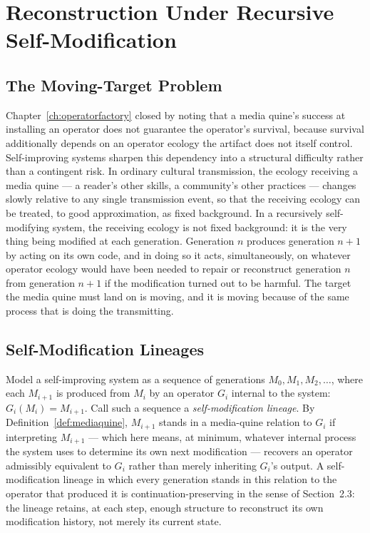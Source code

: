 \documentclass[11pt]{book}
\begin{document}
\chapter{Reconstruction Under Recursive Self-Modification}
\label{ch:reconstruction}

\section{The Moving-Target Problem}

Chapter~\ref{ch:operatorfactory} closed by noting that a media quine's success at installing an operator does not guarantee the operator's survival, because survival additionally depends on an operator ecology the artifact does not itself control. Self-improving systems sharpen this dependency into a structural difficulty rather than a contingent risk. In ordinary cultural transmission, the ecology receiving a media quine --- a reader's other skills, a community's other practices --- changes slowly relative to any single transmission event, so that the receiving ecology can be treated, to good approximation, as fixed background. In a recursively self-modifying system, the receiving ecology is not fixed background: it is the very thing being modified at each generation. Generation $n$ produces generation $n+1$ by acting on its own code, and in doing so it acts, simultaneously, on whatever operator ecology would have been needed to repair or reconstruct generation $n$ from generation $n+1$ if the modification turned out to be harmful. The target the media quine must land on is moving, and it is moving because of the same process that is doing the transmitting.

\section{Self-Modification Lineages}

Model a self-improving system as a sequence of generations $M_0, M_1, M_2, \dots$, where each $M_{i+1}$ is produced from $M_i$ by an operator $G_i$ internal to the system: $G_i(M_i) = M_{i+1}$. Call such a sequence a \emph{self-modification lineage}. By Definition~\ref{def:mediaquine}, $M_{i+1}$ stands in a media-quine relation to $G_i$ if interpreting $M_{i+1}$ --- which here means, at minimum, whatever internal process the system uses to determine its own next modification --- recovers an operator admissibly equivalent to $G_i$ rather than merely inheriting $G_i$'s output. A self-modification lineage in which every generation stands in this relation to the operator that produced it is continuation-preserving in the sense of Section~2.3: the lineage retains, at each step, enough structure to reconstruct its own modification history, not merely its current state.
\end{document}
